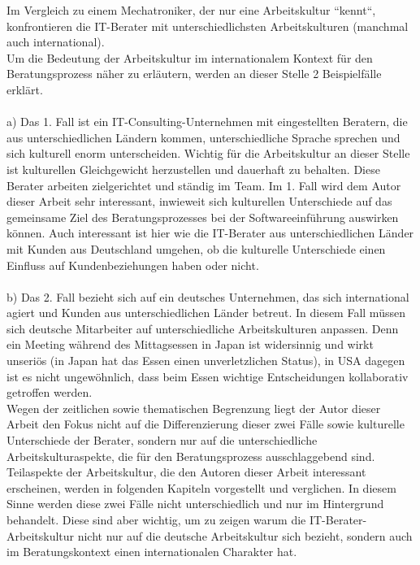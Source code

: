 Im Vergleich zu einem Mechatroniker, der nur eine Arbeitskultur ``kennt``, konfrontieren die IT-Berater mit unterschiedlichsten Arbeitskulturen (manchmal auch international).\\
Um die Bedeutung der Arbeitskultur im internationalem Kontext für den Beratungsprozess näher zu erläutern, werden an dieser Stelle 2 Beispielfälle erklärt.\\
	 \\
	 a) Das 1. Fall ist ein IT-Consulting-Unternehmen mit eingestellten Beratern, die aus unterschiedlichen Ländern kommen, unterschiedliche Sprache sprechen und sich kulturell enorm unterscheiden. Wichtig für die Arbeitskultur an dieser Stelle ist kulturellen Gleichgewicht herzustellen und dauerhaft zu behalten. Diese Berater arbeiten zielgerichtet und ständig im Team. Im 1. Fall wird dem Autor dieser Arbeit sehr interessant, inwieweit sich kulturellen Unterschiede auf das gemeinsame Ziel des Beratungsprozesses bei der Softwareeinführung auswirken können. Auch interessant ist hier wie die IT-Berater aus unterschiedlichen Länder mit Kunden aus Deutschland umgehen, ob die kulturelle Unterschiede einen Einfluss auf Kundenbeziehungen haben oder nicht. \\
	 \\
	 b) Das 2. Fall bezieht sich auf ein deutsches Unternehmen, das sich international agiert und Kunden aus unterschiedlichen Länder betreut. In diesem Fall müssen sich deutsche Mitarbeiter auf unterschiedliche Arbeitskulturen anpassen. Denn ein Meeting während des Mittagsessen in Japan ist widersinnig und wirkt unseriös (in Japan hat das Essen einen unverletzlichen Status), in USA dagegen ist es nicht ungewöhnlich, dass beim Essen wichtige Entscheidungen kollaborativ getroffen werden.\\
	Wegen der zeitlichen sowie thematischen Begrenzung liegt der Autor dieser Arbeit den Fokus nicht auf die Differenzierung dieser zwei Fälle sowie kulturelle Unterschiede der Berater, sondern nur auf die unterschiedliche Arbeitskulturaspekte, die für den Beratungsprozess ausschlaggebend sind. Teilaspekte der Arbeitskultur, die den Autoren dieser Arbeit interessant erscheinen, werden in folgenden Kapiteln vorgestellt und verglichen. In diesem Sinne werden diese zwei Fälle nicht unterschiedlich und nur im Hintergrund behandelt.
	Diese sind aber wichtig, um zu zeigen warum die IT-Berater-Arbeitskultur nicht nur auf die deutsche Arbeitskultur sich bezieht, sondern auch im Beratungskontext einen internationalen Charakter hat.\\
